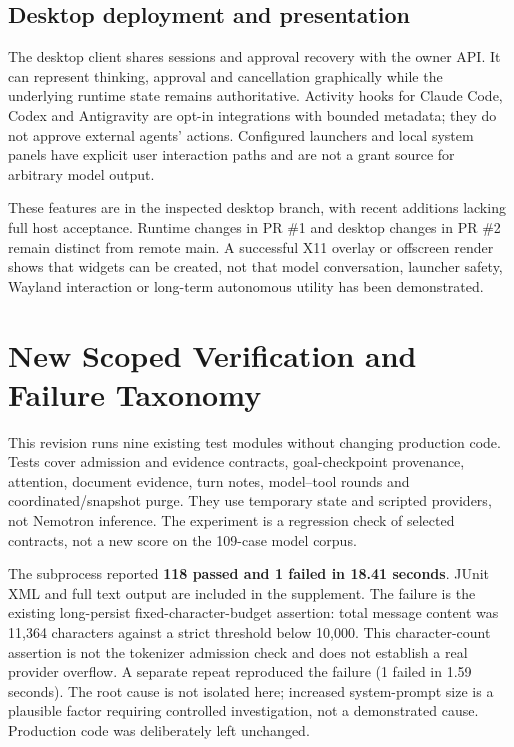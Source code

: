 \documentclass[11pt]{article}
\begin{document}
\subsection{Desktop deployment and presentation}
The desktop client shares sessions and approval recovery with the owner API. It can represent thinking, approval and cancellation graphically while the underlying runtime state remains authoritative. Activity hooks for Claude Code, Codex and Antigravity are opt-in integrations with bounded metadata; they do not approve external agents' actions. Configured launchers and local system panels have explicit user interaction paths and are not a grant source for arbitrary model output.

These features are in the inspected desktop branch, with recent additions lacking full host acceptance. Runtime changes in PR \#1 and desktop changes in PR \#2 remain distinct from remote main. A successful X11 overlay or offscreen render shows that widgets can be created, not that model conversation, launcher safety, Wayland interaction or long-term autonomous utility has been demonstrated.


\section{New Scoped Verification and Failure Taxonomy}\label{sec:newchecks}
This revision runs nine existing test modules without changing production code. Tests cover admission and evidence contracts, goal-checkpoint provenance, attention, document evidence, turn notes, model--tool rounds and coordinated/snapshot purge. They use temporary state and scripted providers, not Nemotron inference. The experiment is a regression check of selected contracts, not a new score on the 109-case model corpus.

The subprocess reported \textbf{118 passed and 1 failed in 18.41 seconds}. JUnit XML and full text output are included in the supplement. The failure is the existing long-persist fixed-character-budget assertion: total message content was 11,364 characters against a strict threshold below 10,000. This character-count assertion is not the tokenizer admission check and does not establish a real provider overflow. A separate repeat reproduced the failure (1 failed in 1.59 seconds). The root cause is not isolated here; increased system-prompt size is a plausible factor requiring controlled investigation, not a demonstrated cause. Production code was deliberately left unchanged.
\end{document}

